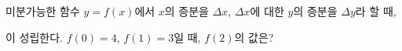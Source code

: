 미분가능한 함수 $y=f(x)$에서 $x$의 증분을 $\Delta x$, $\Delta x$에 대한 $y$의 증분을 $\Delta y$라 할 때,\par\smallskip{}\par\smallskip\noindent 이 성립한다. $f(0)=4$, $f(1)=3$일 때, $f(2)$의 값은? 
